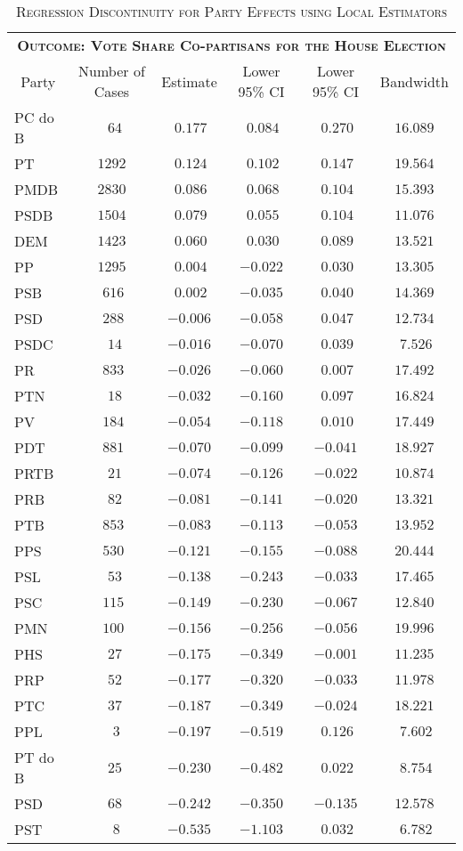 \begin{table}[!tbp]
\caption{\textsc{Regression Discontinuity for Party Effects using Local Estimators}\label{}} 
\begin{tabular}{lccccc}
\toprule
\multicolumn{6}{c}{\bfseries \bfseries{\textsc{Outcome: Vote Share Co-partisans for the House Election}}}\tabularnewline
\cline{1-6}
\multicolumn{1}{c}{Party}&\multicolumn{1}{c}{Number of Cases}&\multicolumn{1}{c}{Estimate}&\multicolumn{1}{c}{Lower 95\% CI}&\multicolumn{1}{c}{Lower 95\% CI}&\multicolumn{1}{c}{Bandwidth}\tabularnewline
\midrule
PC do B&$~~64$&$~0.177$&$~0.084$&$~0.270$&$16.089$\tabularnewline
PT&$1292$&$~0.124$&$~0.102$&$~0.147$&$19.564$\tabularnewline
PMDB&$2830$&$~0.086$&$~0.068$&$~0.104$&$15.393$\tabularnewline
PSDB&$1504$&$~0.079$&$~0.055$&$~0.104$&$11.076$\tabularnewline
DEM&$1423$&$~0.060$&$~0.030$&$~0.089$&$13.521$\tabularnewline
PP&$1295$&$~0.004$&$-0.022$&$~0.030$&$13.305$\tabularnewline
PSB&$~616$&$~0.002$&$-0.035$&$~0.040$&$14.369$\tabularnewline
PSD&$~288$&$-0.006$&$-0.058$&$~0.047$&$12.734$\tabularnewline
PSDC&$~~14$&$-0.016$&$-0.070$&$~0.039$&$~7.526$\tabularnewline
PR&$~833$&$-0.026$&$-0.060$&$~0.007$&$17.492$\tabularnewline
PTN&$~~18$&$-0.032$&$-0.160$&$~0.097$&$16.824$\tabularnewline
PV&$~184$&$-0.054$&$-0.118$&$~0.010$&$17.449$\tabularnewline
PDT&$~881$&$-0.070$&$-0.099$&$-0.041$&$18.927$\tabularnewline
PRTB&$~~21$&$-0.074$&$-0.126$&$-0.022$&$10.874$\tabularnewline
PRB&$~~82$&$-0.081$&$-0.141$&$-0.020$&$13.321$\tabularnewline
PTB&$~853$&$-0.083$&$-0.113$&$-0.053$&$13.952$\tabularnewline
PPS&$~530$&$-0.121$&$-0.155$&$-0.088$&$20.444$\tabularnewline
PSL&$~~53$&$-0.138$&$-0.243$&$-0.033$&$17.465$\tabularnewline
PSC&$~115$&$-0.149$&$-0.230$&$-0.067$&$12.840$\tabularnewline
PMN&$~100$&$-0.156$&$-0.256$&$-0.056$&$19.996$\tabularnewline
PHS&$~~27$&$-0.175$&$-0.349$&$-0.001$&$11.235$\tabularnewline
PRP&$~~52$&$-0.177$&$-0.320$&$-0.033$&$11.978$\tabularnewline
PTC&$~~37$&$-0.187$&$-0.349$&$-0.024$&$18.221$\tabularnewline
PPL&$~~~3$&$-0.197$&$-0.519$&$~0.126$&$~7.602$\tabularnewline
PT do B&$~~25$&$-0.230$&$-0.482$&$~0.022$&$~8.754$\tabularnewline
PSD&$~~68$&$-0.242$&$-0.350$&$-0.135$&$12.578$\tabularnewline
PST&$~~~8$&$-0.535$&$-1.103$&$~0.032$&$~6.782$\tabularnewline
\bottomrule
\end{tabular}
\end{table}
